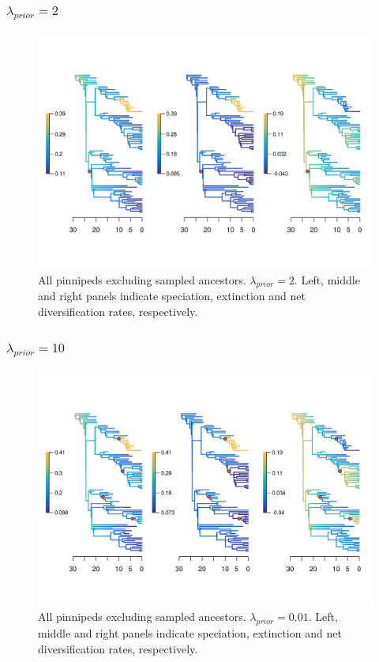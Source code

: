 \documentclass[a4paper, 12pt]{article}
\begin{document}
\subsubsection{$\lambda_{prior} = 2$}

\begin{figure}[H]
  \centering
  \includegraphics[width = \linewidth]{figures/diversification/sensitivity-analyses/shifts-2/sensitivity-analysis-noanc-2.png}
  \caption{All pinnipeds excluding sampled ancestors. $\lambda_{prior} = 2$. Left, middle and right panels indicate speciation, extinction and net diversification rates, respectively.}
  \label{fig-noanc-2}
\end{figure}

\subsubsection{$\lambda_{prior} = 10$}

\begin{figure}[H]
  \centering
  \includegraphics[width = \linewidth]{figures/diversification/sensitivity-analyses/shifts-10/sensitivity-analysis-noanc-10.png}
  \caption{All pinnipeds excluding sampled ancestors. $\lambda_{prior} = 0.01$. Left, middle and right panels indicate speciation, extinction and net diversification rates, respectively.}
  \label{fig-noanc-10}
\end{figure}
\end{document}

